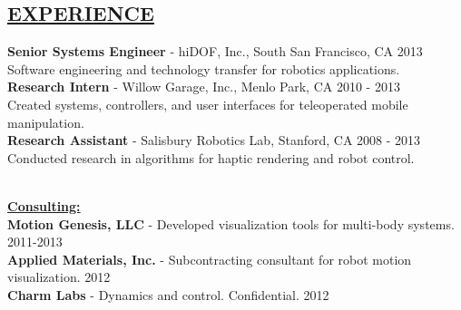 \documentclass[line,margin]{res}
\newcommand{\CVOnly}[1]{}
\newcommand{\CVOnly}[1]{#1}
\newcommand{\hide}[1]{}
\begin{document}
\begin{resume}
\section{\underline{EXPERIENCE}}
\vspace{1.0pc}
{\bf Senior Systems Engineer} - hiDOF, Inc., South San Francisco, CA  \hfill 2013
\\[0.0pc]Software engineering  and technology transfer for robotics applications.
%
\\[0.4pc]{\bf Research Intern} - Willow Garage, Inc., Menlo Park, CA \hfill 2010 - 2013
\\[0.0pc]Created systems, controllers, and user interfaces for teleoperated mobile manipulation.
%
\\[0.4pc]{\bf Research Assistant} - Salisbury Robotics Lab, Stanford, CA \hfill 2008 - 2013
\\[0.0pc]Conducted research in algorithms for haptic rendering and robot control.
\CVOnly{\\[0.0pc]Implemented miniature stereo camera sensor hardware for a robot gripper.}
%
\CVOnly{
\\[0.4pc]{\bf Electrical Engineering Intern} - Qual-Tron, Inc., Tulsa, OK \hfill 2006 - 2007
\\[0.0pc] Designed and implemented test procedures for IR and magnetic sensor products.
\\[0.0pc]Led redesign of a magnetic sensor product to reduce cost and simplify assembly.}
%
\hide{
\\[0.4pc]{\bf Summer Intern} - Atmel Corporation \hfill 2005
\\[0.4pc]{\bf Summer Research Intern} - NASA Glenn Research Center \hfill 2004%
}
%
\\[0.4pc]{\bf \underline{Consulting:}}
\\[0.2pc]{\bf Motion Genesis, LLC} - Developed visualization tools for multi-body systems. \hfill 2011-2013
\\[0.0pc]{\bf Applied Materials, Inc.} - Subcontracting consultant for robot motion visualization. \hfill 2012
\\[0.0pc]{\bf Charm Labs} - Dynamics and control. Confidential. \hfill 2012
%

%
%

\end{resume}
\end{document}
